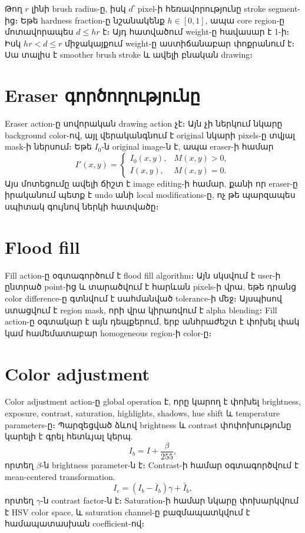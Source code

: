 \documentclass[12pt,a4paper]{report}
\begin{document}
Թող $r$ լինի brush radius-ը, իսկ $d$՝ pixel-ի հեռավորությունը stroke segment-ից։ Եթե hardness fraction-ը նշանակենք $h\in[0,1]$, ապա core region-ը մոտավորապես $d\leq hr$ է։ Այդ հատվածում weight-ը հավասար է 1-ի։ Իսկ $hr<d\leq r$ միջակայքում weight-ը աստիճանաբար փոքրանում է։ Սա տալիս է smoother brush stroke և ավելի բնական drawing։

\section{Eraser գործողությունը}

Eraser action-ը սովորական drawing action չէ։ Այն չի ներկում նկարը background color-ով, այլ վերականգնում է original նկարի pixels-ը տվյալ mask-ի ներսում։ Եթե $I_0$-ն original image-ն է, ապա eraser-ի համար
\begin{equation}
    I'(x,y) =
    \begin{cases}
    I_0(x,y), & M(x,y)>0,\\
    I(x,y), & M(x,y)=0.
    \end{cases}
\end{equation}
Այս մոտեցումը ավելի ճիշտ է image editing-ի համար, քանի որ eraser-ը իրականում պետք է undo անի local modifications-ը, ոչ թե պարզապես սպիտակ գույնով ներկի հատվածը։

\section{Flood fill}

Fill action-ը օգտագործում է flood fill algorithm։ Այն սկսվում է user-ի ընտրած point-ից և տարածվում է հարևան pixels-ի վրա, եթե դրանց color difference-ը գտնվում է սահմանված tolerance-ի մեջ։ Այսպիսով ստացվում է region mask, որի վրա կիրառվում է alpha blending։ Fill action-ը օգտակար է այն դեպքերում, երբ անհրաժեշտ է փոխել փակ կամ համեմատաբար homogeneous region-ի color-ը։

\section{Color adjustment}

Color adjustment action-ը global operation է, որը կարող է փոխել brightness, exposure, contrast, saturation, highlights, shadows, hue shift և temperature parameters-ը։ Պարզեցված ձևով brightness և contrast փոփոխությունը կարելի է գրել հետևյալ կերպ.
\begin{equation}
    I_b = I + \frac{\beta}{255},
\end{equation}
որտեղ $\beta$-ն brightness parameter-ն է։ Contrast-ի համար օգտագործվում է mean-centered transformation.
\begin{equation}
    I_c = (I_b - \bar{I}_b)\gamma + \bar{I}_b,
\end{equation}
որտեղ $\gamma$-ն contrast factor-ն է։ Saturation-ի համար նկարը փոխարկվում է HSV color space, և saturation channel-ը բազմապատկվում է համապատասխան coefficient-ով։
\end{document}

